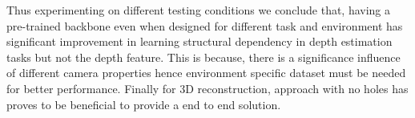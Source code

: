 Thus experimenting on different testing conditions we conclude that, having a pre-trained backbone even when designed for different task and environment has significant improvement in learning structural dependency in depth estimation tasks but not the depth feature. This is because, there is a significance influence of different camera properties hence environment specific dataset must be needed for better performance. Finally for 3D reconstruction, approach with no holes has proves to be beneficial to provide a end to end solution.


